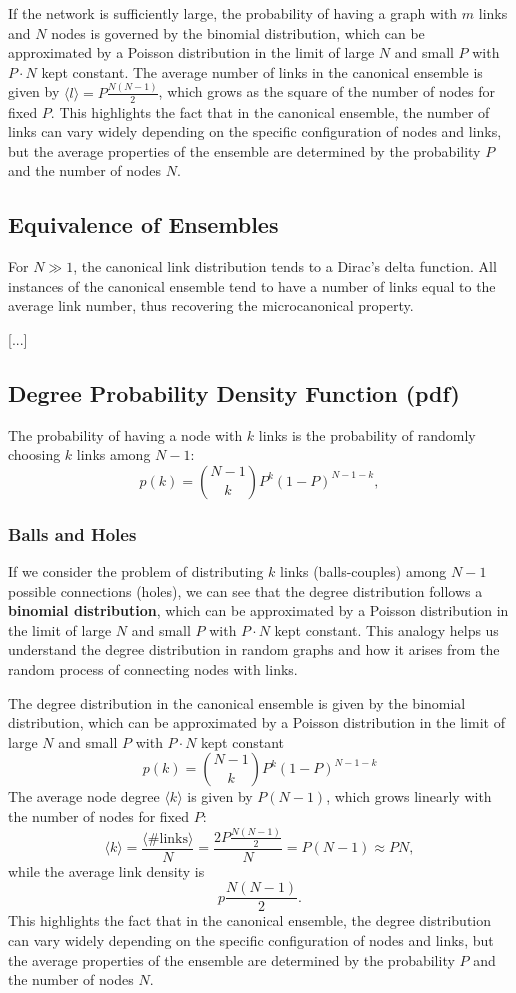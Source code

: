 If the network is sufficiently large, the probability of having a graph with $m$ links and $N$ nodes is governed by the binomial distribution, which can be approximated by a Poisson distribution in the limit of large $N$ and small $P$ with $P \cdot N$ kept constant. The average number of links in the canonical ensemble is given by $\langle l \rangle = P \frac{N(N-1)}{2}$, which grows as the square of the number of nodes for fixed $P$. This highlights the fact that in the canonical ensemble, the number of links can vary widely depending on the specific configuration of nodes and links, but the average properties of the ensemble are determined by the probability $P$ and the number of nodes $N$.

\subsection{Equivalence of Ensembles}
For $N \gg 1$, the canonical link distribution tends to a Dirac's delta function. All instances of the canonical ensemble tend to have a number of links equal to the average link number, thus recovering the microcanonical property.

    [...]

\subsection{Degree Probability Density Function (pdf)}
The probability of having a node with $k$ links is the probability of randomly choosing $k$ links among $N-1$:
\[
    p(k) = \binom{N-1}{k} P^k (1-P)^{N-1-k},
\]

\subsubsection{Balls and Holes}
If we consider the problem of distributing $k$ links (balls-couples) among $N-1$ possible connections (holes), we can see that the degree distribution follows a \textbf{binomial distribution}, which can be approximated by a Poisson distribution in the limit of large $N$ and small $P$ with $P \cdot N$ kept constant. This analogy helps us understand the degree distribution in random graphs and how it arises from the random process of connecting nodes with links.

The degree distribution in the canonical ensemble is given by the binomial distribution, which can be approximated by a Poisson distribution in the limit of large $N$ and small $P$ with $P \cdot N$ kept constant
\[
    p(k) = \binom{N-1}{k} P^k (1-P)^{N-1-k}
\]
The average node degree $\langle k \rangle$ is given by $P(N-1)$, which grows linearly with the number of nodes for fixed $P$:
\[
    \langle k \rangle = \frac{\langle \# \text{links} \rangle}{N} = \frac{2 P \frac{N(N-1)}{2}}{N} = P(N-1) \approx PN,
\]
while the average link density is
\[
    p \frac{N(N-1)}{2}.
\]
This highlights the fact that in the canonical ensemble, the degree distribution can vary widely depending on the specific configuration of nodes and links, but the average properties of the ensemble are determined by the probability $P$ and the number of nodes $N$.

